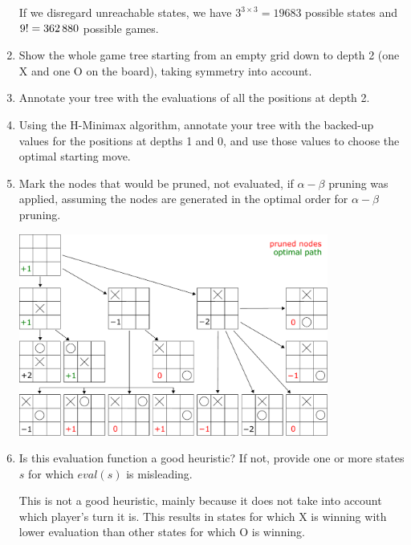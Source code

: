 \documentclass[11pt, a4paper]{article}
\begin{document}
\begin{enumerate}
    \begin{solution}
        If we disregard unreachable states, we have $3^{3 \times 3} = \num{19683}$ possible states and $9! = \num{362880}$ possible games.
    \end{solution}
    
    \item Show the whole game tree starting from an empty grid down to depth 2 (one X and one O on the board), taking symmetry into account.
    \item Annotate your tree with the evaluations of all the positions at depth 2.
    \item Using the H-Minimax algorithm, annotate your tree with the backed-up values for the positions at depths 1 and 0, and use those values to choose the optimal starting move.
    \item Mark the nodes that would be pruned, \ie{} not evaluated, if $\alpha - \beta$ pruning was applied, assuming the nodes are generated in the optimal order for $\alpha - \beta$ pruning.
    
    \begin{solution}
        \begin{center}
            \includegraphics[width=0.8\textwidth]{figures/e2_tictactoe.pdf}
        \end{center}
    \end{solution}
    
    \item Is this evaluation function a good heuristic? If not, provide one or more states $s$ for which $eval(s)$ is misleading.
    
    \begin{solution}
        This is not a good heuristic, mainly because it does not take into account which player's turn it is. This results in states for which X is winning with lower evaluation than other states for which O is winning.
        

\end{solution}
\end{enumerate}
\end{document}
